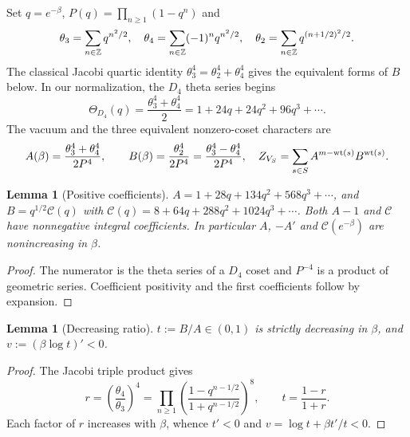 \documentclass[10pt,a4paper]{article}
\numberwithin{equation}{section}
\newtheorem{lemma}[theorem]{Lemma}\newtheorem{proposition}[theorem]{Proposition}
\theoremstyle{remark}\newtheorem{remark}[theorem]{Remark}\newtheorem{question}[theorem]{Question}
\begin{document}
Set $q=e^{-\beta}$, $P(q)=\prod_{n\ge1}(1-q^n)$ and
\[\theta_3=\sum_{n\in\mathbb Z}q^{n^2/2},\quad\theta_4=\sum_{n\in\mathbb Z}(-1)^nq^{n^2/2},\quad\theta_2=\sum_{n\in\mathbb Z}q^{(n+1/2)^2/2}.\]
The classical Jacobi quartic identity $\theta_3^4=\theta_2^4+\theta_4^4$ gives the equivalent forms of $B$ below. In our normalization, the $D_4$ theta series begins
\[
\Theta_{D_4}(q)=\frac{\theta_3^4+\theta_4^4}{2}=1+24q+24q^2+96q^3+\cdots.
\]
The vacuum and the three equivalent nonzero-coset characters are
\begin{equation}\label{eq:characters}
A(\beta)=\frac{\theta_3^4+\theta_4^4}{2P^4},\qquad
B(\beta)=\frac{\theta_2^4}{2P^4}=\frac{\theta_3^4-\theta_4^4}{2P^4},\quad
Z_{V_S}=\sum_{s\in S}A^{m-\mathrm{wt}(s)}B^{\mathrm{wt}(s)}.
\end{equation}
\begin{lemma}[Positive coefficients]\label{lem:coeff}
$A=1+28q+134q^2+568q^3+\cdots$, and $B=q^{1/2}\mathcal C(q)$ with $\mathcal C(q)=8+64q+288q^2+1024q^3+\cdots$. Both $A-1$ and $\mathcal C$ have nonnegative integral coefficients. In particular $A$, $-A'$ and $\mathcal C(e^{-\beta})$ are nonincreasing in $\beta$.
\end{lemma}
\begin{proof}The numerator is the theta series of a $D_4$ coset and $P^{-4}$ is a product of geometric series. Coefficient positivity and the first coefficients follow by expansion.\end{proof}
\begin{lemma}[Decreasing ratio]\label{lem:t}
$t:=B/A\in(0,1)$ is strictly decreasing in $\beta$, and $v:=(\beta\log t)'<0$.
\end{lemma}
\begin{proof}The Jacobi triple product gives
\[
r=\left(\frac{\theta_4}{\theta_3}\right)^4=\prod_{n\ge1}\left(\frac{1-q^{n-1/2}}{1+q^{n-1/2}}\right)^8,
\qquad t=\frac{1-r}{1+r}.
\]
Each factor of $r$ increases with $\beta$, whence $t'<0$ and $v=\log t+\beta t'/t<0$.\end{proof}
\end{document}
